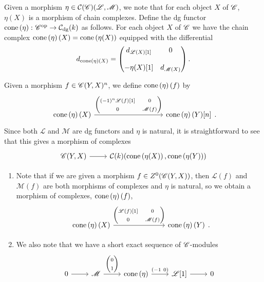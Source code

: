 \documentclass[dissertation.tex]{subfiles}
\begin{document}
\begin{defn}
  Given a morphism $\eta \in \mathcal{C}(\mathscr{C})(\mathscr{L}, \mathscr{M})$, we note that for each object $X$ of $\mathscr{C}$, $\eta(X)$ is a morphism of chain complexes.
  Define the dg functor $\operatorname{cone}\left(\eta\right) \colon \mathscr{C}^\text{op} \rightarrow \mathcal{C}_\text{dg}(k)$ as follows.
  For each object $X$ of $\mathscr{C}$ we have the chain complex $\operatorname{cone}\left(\eta\right)(X) = \operatorname{cone}\left(\eta(X)\right)$ equipped with the differential
  $$d_{\operatorname{cone}\left(\eta\right)(X)} = \left(\begin{matrix}
    d_{\mathscr{L}(X)[1]} & 0\\
    \\
    -\eta(X)[1] & d_{\mathscr{M}(X)}
  \end{matrix}\right).$$

  Given a morphism $f \in \mathscr{C}(Y,X)^n$, we define $\operatorname{cone}\left(\eta\right)(f)$ by
  $$\begin{tikzcd}[ampersand replacement=\&]
      \cone{\eta}(X) \arrow{rrrr}{\left(\begin{matrix}(-1)^n\mathscr{L}(f)[1] & 0\\0 & \mathscr{M}(f)\end{matrix}\right)} \&\&\&\& \cone{\eta}(Y)[n]
    \end{tikzcd}.$$
  Since both $\mathscr{L}$ and $\mathscr{M}$ are dg functors and $\eta$ is natural, it is straightforward to see that this gives a morphism of complexes
  $$\begin{tikzcd}
    \CC(Y,X) \arrow{r} & \mathcal{C}(k)(\cone{\eta(X)}, \cone{\eta(Y)})
  \end{tikzcd}$$
\end{defn}

\begin{rmk}
  \begin{enumerate}
  \item
    Note that if we are given a morphism $f \in Z^0(\mathscr{C}(Y,X))$, then $\mathscr{L}(f)$ and $\mathscr{M}(f)$ are both morphisms of complexes and $\eta$ is natural, so we obtain a morphism of complexes, $\operatorname{cone}\left(\eta\right)(f)$,
    $$\begin{tikzcd}[ampersand replacement=\&]
      \cone{\eta}(X) \arrow{rrr}{\left(\begin{matrix}\mathscr{L}(f)[1] & 0\\0 & \mathscr{M}(f)\end{matrix}\right)} \&\&\& \cone{\eta}(Y)
    \end{tikzcd}.$$
  \item
    We also note that we have a short exact sequence of $\mathscr{C}$-modules
    $$\begin{tikzcd}
      0 \arrow{r} & \mathscr{M} \arrow{r}{\left(\begin{matrix}0\\1\end{matrix}\right)} & \cone{\eta} \arrow{r}{\left(-1\ 0\right)} & \mathscr{L}[1] \arrow{r} & 0
    \end{tikzcd}$$
  \end{enumerate}
\end{rmk}
\end{document}
